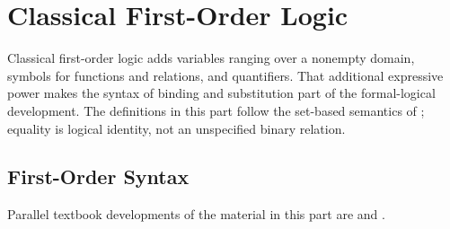 \part{Classical First-Order Logic}
\label{part:classical-first-order}

Classical first-order logic adds variables ranging over a nonempty domain,
symbols for functions and relations, and quantifiers.  That additional
expressive power makes the syntax of binding and substitution part of the
formal-logical development.  The definitions in this part follow the set-based semantics of
\cite{EbbinghausFlumThomas1994,Hodges1993}; equality is logical identity, not
an unspecified binary relation.

\chapter{First-Order Syntax}
\label{ch:fol-syntax-semantics}

Parallel textbook developments of the material in this part are
\cite{ChiswellHodges2007} and \cite{EbbinghausFlumThomas1994}.

